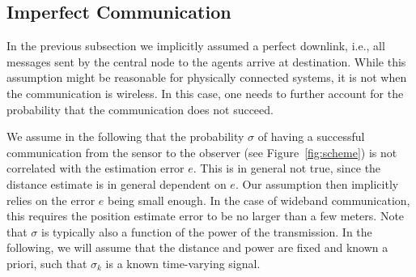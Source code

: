 \documentclass[letterpaper, 10 pt, conference]{ieeeconf}  %
\newcommand{\todo}[1]{
	\begin{center}
		\fcolorbox{wheat}{wheat}{\parbox[t]{0.9\linewidth}{\textbf{ToDo:} #1}}
	\end{center}}
\newcommand{\themis}[1]{
		\begin{center}
			\fcolorbox{themis}{themis}{\parbox[t]{0.9\linewidth}{\textbf{Themis:} #1}}
	\end{center}}
\begin{document}
\subsection{Imperfect Communication}

In the previous subsection we implicitly assumed a perfect downlink, i.e., all messages sent by the central node to the agents arrive at destination. While this assumption might be reasonable for physically connected systems, it is not when the communication is wireless. 
In this case, one needs to further account for the probability that the communication does not succeed.

We assume in the following that the probability $\sigma$ of having a successful communication from the sensor to the observer (see Figure~\ref{fig:scheme}) is not correlated with the estimation error $e$. This is in general not true, since the distance estimate is in general dependent on $e$. Our assumption then implicitly relies on the error $e$ being small enough. In the case of wideband communication, this requires the position estimate error to be no larger than a few meters. %
Note that $\sigma$ is typically also a function of the power of the transmission. In the following, we will assume that the distance and power are fixed and known a priori, such that $\sigma_k$ is a known time-varying signal.
\end{document}
